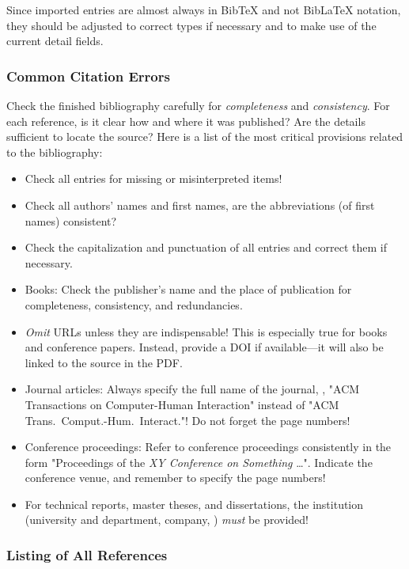 Since imported entries are almost always in BibTeX and not BibLaTeX notation,
they should be adjusted to correct types if necessary and to make use of the
current detail fields.

\subsubsection{Common Citation Errors}

Check the finished bibliography carefully for \emph{completeness} and
\emph{consistency}. For each reference, is it clear how and where it was
published? Are the details sufficient to locate the source? Here is a list of
the most critical provisions related to the bibliography:
%
\begin{itemize}
    \item Check all entries for missing or misinterpreted items!
    \item Check all authors' names and first names, are the abbreviations (of
    first names) consistent?
    \item Check the capitalization and punctuation of all entries and correct
    them if necessary.
    \item Books: Check the publisher's name and the place of publication for 
    completeness, consistency, and redundancies.
    \item \emph{Omit} URLs unless they are indispensable! This is especially
    true for books and conference papers. Instead, provide a DOI if
    available---it will also be linked to the source in the PDF.
    \item Journal articles: Always specify the full name of the journal, \eg,
    "ACM Transactions on Computer-Human Interaction" instead of "ACM Trans.\
    Comput.-Hum.\ Interact."! Do not forget the page numbers!
    \item Conference proceedings: Refer to conference proceedings consistently
    in the form "Proceedings of the \emph{XY Conference on Something} \ldots".
    Indicate the conference venue, and remember to specify the page numbers!
    \item For technical reports, master theses, and dissertations, the
    institution (university and department, company, \etc) \emph{must} be
    provided!
\end{itemize}

\subsubsection{Listing of All References}

